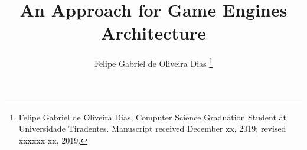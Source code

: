 



\title{An Approach for Game Engines Architecture}

\author{Felipe Gabriel de Oliveira Dias%
\thanks{Felipe Gabriel de Oliveira Dias, Computer Science Graduation Student at Universidade Tiradentes. Manuscript received December xx, 2019; revised xxxxxx xx, 2019.}}

%
{}

\IEEEtitleabstractindextext{%
\begin{abstract}

\end{abstract}

\begin{IEEEkeywords}

\end{IEEEkeywords}
}

\maketitle
\IEEEdisplaynontitleabstractindextext

\IEEEpeerreviewmaketitle












\ifCLASSOPTIONcaptionsoff
  \newpage
\fi




